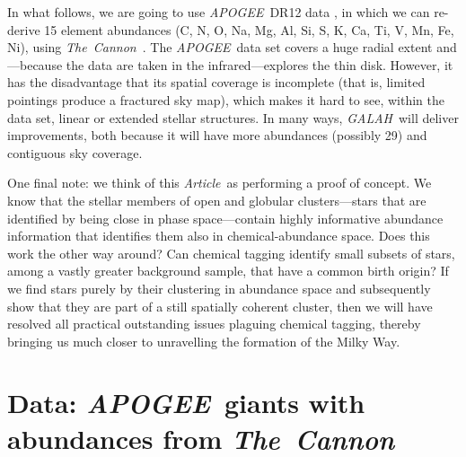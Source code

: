 \documentclass[12pt, letterpaper, preprint]{aastex}
\newcommand{\acronym}[1]{{\small{#1}}}
\newcommand{\project}[1]{\textsl{#1}}
\newcommand{\apogee}{\project{\acronym{APOGEE}}}
\newcommand{\galah}{\project{\acronym{GALAH}}}
\newcommand{\thecannon}{\project{The~Cannon}}
\newcommand{\documentname}{\textsl{Article}}
\begin{document}
In what follows, we are going to use \apogee\ \acronym{DR12} data \citep{dr12}, in
which we can re-derive 15 element abundances (C, N, O, Na, Mg, Al, Si,
S, K, Ca, Ti, V, Mn, Fe, Ni), using \thecannon\ \citep{thecannon}.
The \apogee\ data set covers a huge radial extent and---because the
data are taken in the infrared---explores the thin disk.
However, it has the disadvantage that its spatial coverage is incomplete
(that is, limited pointings produce a fractured sky map),
which makes it hard to see, within the data set, linear or
extended stellar structures.
In many ways, \galah\ will deliver improvements, both because it will
have more abundances (possibly 29) and contiguous sky coverage.

One final note:
we think of this \documentname\ as performing a proof of concept.
We know that the stellar members of open and globular clusters---stars
that are identified by being close in phase space---contain highly
informative abundance information that identifies them also in
chemical-abundance space.  Does this work the other way around? 
Can chemical tagging identify small subsets of stars, among a vastly
greater background sample, that have a common birth origin? If we 
find stars purely by their clustering in abundance space and subsequently
show that they are part of a still spatially coherent cluster, then
we will have resolved all practical outstanding issues plaguing 
chemical tagging, thereby bringing us much closer to
unravelling the formation of the Milky Way.

\section{Data: \apogee\ giants with abundances from \thecannon}\label{sec:data}
\end{document}
